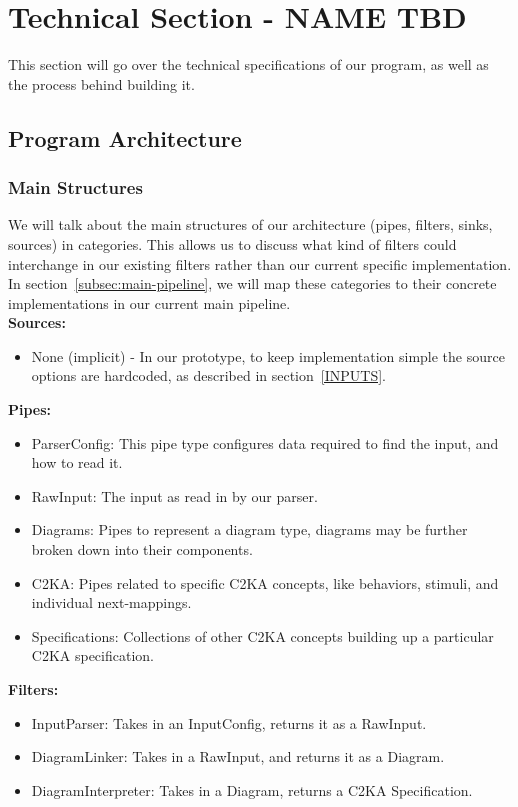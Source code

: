 \documentclass[11pt]{article}
\begin{document}
    \section{Technical Section - NAME TBD}
    This section will go over the technical specifications of our program, as well as the process behind building it.
    \subsection{Program Architecture}

    \subsubsection{Main Structures}\label{subsec:main-structures}
    We will talk about the main structures of our architecture (pipes, filters, sinks, sources) in categories.
    This allows us to discuss what kind of filters could interchange in our existing filters
    rather than our current specific implementation.
    In section~\ref{subsec:main-pipeline}, we will map these categories to their concrete implementations in our current main pipeline.\\
    \textbf{Sources:}
    \begin{itemize}
        \item None (implicit) - In our prototype, to keep implementation simple the source options
        are hardcoded, as described in section~\ref{INPUTS}.
    \end{itemize}
    \textbf{Pipes:}
    \begin{itemize}
        \item ParserConfig: This pipe type configures data required to find the input, and how to read it.
        \item RawInput: The input as read in by our parser.
        \item Diagrams: Pipes to represent a diagram type, diagrams may be further broken down into their components.
        \item C2KA: Pipes related to specific C2KA concepts, like behaviors, stimuli, and individual next-mappings.
        \item Specifications: Collections of other C2KA concepts building up a particular C2KA specification.
    \end{itemize}
    \textbf{Filters:}
    \begin{itemize}a
        \item InputParser: Takes in an InputConfig, returns it as a RawInput.
        \item DiagramLinker: Takes in a RawInput, and returns it as a Diagram.
        \item DiagramInterpreter: Takes in a Diagram, returns a C2KA Specification.
    \end{itemize}
\end{document}
